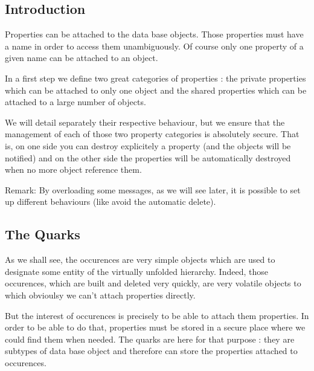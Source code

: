 \hypertarget{classHurricane_1_1Property_secPropertyIntro}{}\subsection{Introduction}\label{classHurricane_1_1Property_secPropertyIntro}
Properties can be attached to the data base objects. Those properties must have a name in order to access them unambiguously. Of course only one property of a given name can be attached to an object.

In a first step we define two great categories of properties \-: the private properties which can be attached to only one object and the shared properties which can be attached to a large number of objects.

We will detail separately their respective behaviour, but we ensure that the management of each of those two property categories is absolutely secure. That is, on one side you can destroy explicitely a property (and the objects will be notified) and on the other side the properties will be automatically destroyed when no more object reference them.

\begin{DoxyParagraph}{Remark\-:}
By overloading some messages, as we will see later, it is possible to set up different behaviours (like avoid the automatic delete).
\end{DoxyParagraph}
\hypertarget{classHurricane_1_1Property_secPropertyTheQuarks}{}\subsection{The Quarks}\label{classHurricane_1_1Property_secPropertyTheQuarks}
As we shall see, the occurences are very simple objects which are used to designate some entity of the virtually unfolded hierarchy. Indeed, those occurences, which are built and deleted very quickly, are very volatile objects to which obvioulsy we can't attach properties directly.

But the interest of occurences is precisely to be able to attach them properties. In order to be able to do that, properties must be stored in a secure place where we could find them when needed. The quarks are here for that purpose \-: they are subtypes of data base object and therefore can store the properties attached to occurences.

